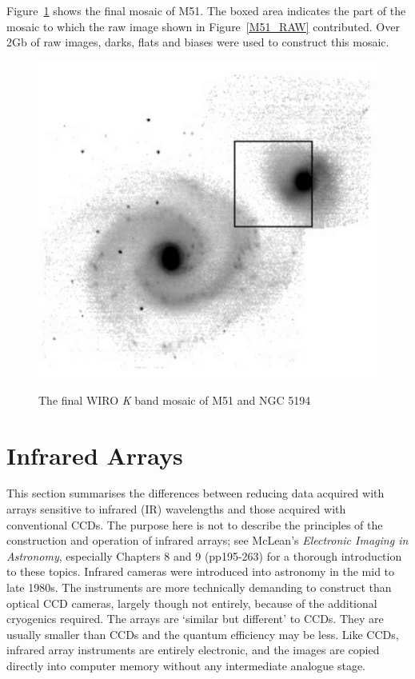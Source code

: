 \documentclass[twoside,11pt]{starlink}
\begin{document}
Figure~\ref{M51_MOSAIC} shows the final mosaic of M51.  The boxed
area indicates the part of the mosaic to which the raw image shown
in Figure~\ref{M51_RAW} contributed.  Over 2Gb of raw images, darks,
flats and biases were used to construct this mosaic.

\begin{figure}[htbp]
   \centering
   \includegraphics[totalheight=4in]{sc5_m51_mosaic}
   \begin{quote}
   \caption{The final WIRO \textit{K}\/ band mosaic of M51 and NGC 5194
   \label{M51_MOSAIC} }
   \end{quote}
\end{figure}


\section{\label{IR}Infrared Arrays}

This section summarises the differences between reducing data acquired
with arrays sensitive to infrared (IR) wavelengths and those acquired
with conventional CCDs.  The purpose here is not to describe the principles
of the construction and operation of infrared arrays; see McLean's \textit{Electronic Imaging in Astronomy}\/\cite{MCLEAN97}, especially Chapters 8
and 9 (pp195-263) for a thorough introduction to these topics.  Infrared
cameras were introduced into astronomy in the mid to late 1980s.  The
instruments are more technically demanding to construct than optical
CCD cameras, largely though not entirely, because of the additional
cryogenics required.  The arrays are `similar but different' to CCDs.
They are usually smaller than CCDs and the quantum efficiency may be less.
Like CCDs, infrared array instruments are entirely electronic, and the
images are copied directly into computer memory without any intermediate
analogue stage.
\end{document}
